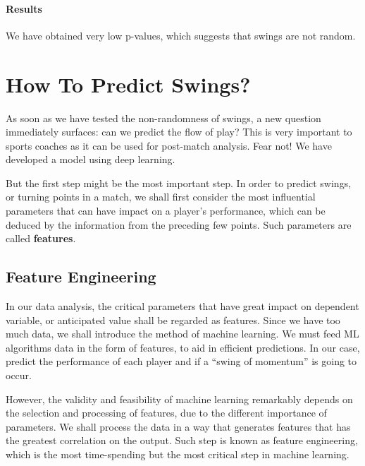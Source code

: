 \documentclass[11pt,a4paper]{article}
\begin{document}
	\paragraph{Results}
	We have obtained very low p-values, which suggests that swings are not random.
	
	\section{How To Predict Swings?}
	As soon as we have tested the non-randomness of swings, a new question immediately surfaces: can we predict the flow of play? This is very important to sports coaches as it can be used for post-match analysis. Fear not! We have developed a model using deep learning.
	
	But the first step might be the most important step. In order to predict swings, or turning points in a match, we shall first consider the most influential parameters that can have impact on a player’s performance, which can be deduced by the information from the preceding few points. Such parameters are called \textbf{features}.
	
	\subsection{Feature Engineering}
	In our data analysis, the critical parameters that have great impact on dependent variable, or anticipated value shall be regarded as features. Since we have too much data, we shall introduce the method of machine learning. We must feed ML algorithms data in the form of features, to aid in efficient predictions. In our case, predict the performance of each player and if a “swing of momentum” is going to occur.
	
	However, the validity and feasibility of machine learning remarkably depends on the selection and processing of features, due to the different importance of parameters. We shall process the data in a way that generates features that has the greatest correlation on the output. Such step is known as feature engineering, which is the most time-spending but the most critical step in machine learning.
	
\end{document}
